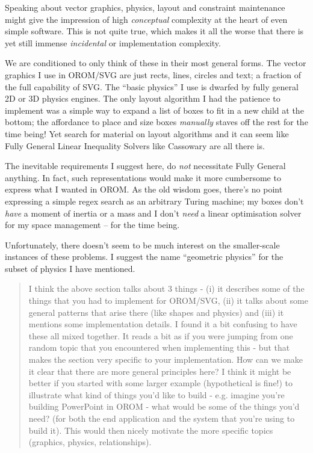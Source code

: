 \documentclass[english,submission]{programming}
\begin{document}
Speaking about vector graphics, physics, layout and constraint
maintenance might give the impression of high \emph{conceptual}
complexity at the heart of even simple software. This is not quite true,
which makes it all the worse that there is yet still immense
\emph{incidental} or implementation complexity.

We are conditioned to only think of these in their most general forms.
The vector graphics I use in OROM/SVG are just rects, lines, circles and
text; a fraction of the full capability of SVG. The ``basic physics'' I
use is dwarfed by fully general 2D or 3D physics engines. The only
layout algorithm I had the patience to implement was a simple way to
expand a list of boxes to fit in a new child at the bottom; the
affordance to place and size boxes \emph{manually} staves off the rest
for the time being! Yet search for material on layout algorithms and it
can seem like Fully General Linear Inequality Solvers like Cassowary are
all there is.

The inevitable requirements I suggest here, do \emph{not} necessitate
Fully General anything. In fact, such representations would make it more
cumbersome to express what I wanted in OROM. As the old wisdom goes,
there's no point expressing a simple regex search as an arbitrary Turing
machine; my boxes don't \emph{have} a moment of inertia or a mass and I
don't \emph{need} a linear optimisation solver for my space management
-- for the time being.

Unfortunately, there doesn't seem to be much interest on the
smaller-scale instances of these problems. I suggest the name
``geometric physics'' for the subset of physics I have mentioned.

\begin{quote}
I think the above section talks about 3 things - (i) it describes some
of the things that you had to implement for OROM/SVG, (ii) it talks
about some general patterns that arise there (like shapes and physics)
and (iii) it mentions some implementation details. I found it a bit
confusing to have these all mixed together. It reads a bit as if you
were jumping from one random topic that you encountered when
implementing this - but that makes the section very specific to your
implementation. How can we make it clear that there are more general
principles here? I think it might be better if you started with some
larger example (hypothetical is fine!) to illustrate what kind of things
you'd like to build - e.g. imagine you're building PowerPoint in OROM -
what would be some of the things you'd need? (for both the end
application and the system that you're using to build it). This would
then nicely motivate the more specific topics (graphics, physics,
relationships).
\end{quote}
\end{document}
